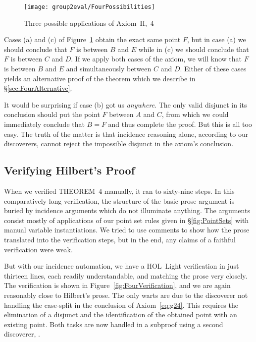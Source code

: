 \begin{figure}
  \texttt{[image: group2eval/FourPossibilities]}
  \caption{Three possible applications of Axiom~II,~4}
  \label{fig:FourPossibilities}
\end{figure}

Cases (a) and (c) of Figure~\ref{fig:FourPossibilities} obtain the exact same point $F$, but in case (a) we should conclude that $F$ is between $B$ and $E$ while in (c) we should conclude that $F$ is between $C$ and $D$. If we apply both cases of the axiom, we will know that $F$ is between $B$ and $E$ and simultaneously between $C$ and $D$. Either of these cases yields an alternative proof of the theorem which we describe in \S\ref{sec:FourAlternative}.

It would be surprising if case (b) got us \emph{anywhere}. The only valid disjunct in its conclusion should put the point $F$ between $A$ and $C$, from which we could immediately conclude that $B = F$ and thus complete the proof. But this is all too easy. The truth of the matter is that incidence reasoning alone, according to our discoverers, cannot reject the impossible disjunct in the axiom's conclusion.

\subsection{Verifying Hilbert's Proof}
When we verified THEOREM~4 manually, it ran to sixty-nine steps. In this comparatively long verification, the structure of the basic prose argument is buried by incidence arguments which do not illuminate anything. The arguments consist mostly of applications of our point set rules given in \S\ref{fig:PointSets} with manual variable instantiations. We tried to use comments to show how the prose translated into the verification steps, but in the end, any claims of a faithful verification were weak.

But with our incidence automation, we have a HOL~Light verification in just thirteen lines, each readily understandable, and matching the prose very closely. The verification is shown in Figure~\ref{fig:FourVerification}, and we are again reasonably close to Hilbert's prose. The only warts are due to the  discoverer not handling the case-split in the conclusion of Axiom~\ref{eq:g24}. This requires the elimination of a disjunct and the identification of the obtained point with an existing point. Both tasks are now handled in a subproof using a second discoverer, . 

